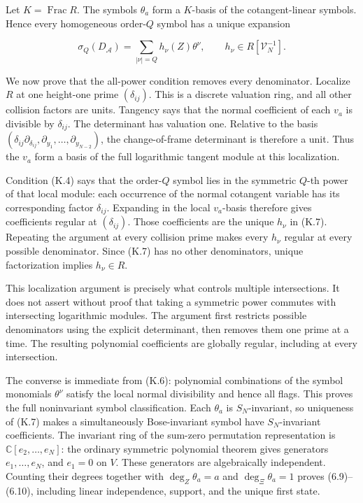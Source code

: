 Let \(K=\operatorname{Frac}R\). The symbols \(\theta_a\) form a \(K\)-basis of the cotangent-linear symbols. Hence every homogeneous order-\(Q\) symbol has a unique expansion

\[
\sigma_Q(D_{\mathcal A})=\sum_{|\nu|=Q}h_\nu(Z)\theta^\nu,
\qquad h_\nu\in R[\mathcal V_N^{-1}].
\tag{K.7}
\]

We now prove that the all-power condition removes every denominator. Localize \(R\) at one height-one prime \((\delta_{ij})\). This is a discrete valuation ring, and all other collision factors are units. Tangency says that the normal coefficient of each \(v_a\) is divisible by \(\delta_{ij}\). The determinant has valuation one. Relative to the basis \((\delta_{ij}\partial_{\delta_{ij}},\partial_{y_1},\ldots,\partial_{y_{N-2}})\), the change-of-frame determinant is therefore a unit. Thus the \(v_a\) form a basis of the full logarithmic tangent module at this localization.

Condition (K.4) says that the order-\(Q\) symbol lies in the symmetric \(Q\)-th power of that local module: each occurrence of the normal cotangent variable has its corresponding factor \(\delta_{ij}\). Expanding in the local \(v_a\)-basis therefore gives coefficients regular at \((\delta_{ij})\). Those coefficients are the unique \(h_\nu\) in (K.7). Repeating the argument at every collision prime makes every \(h_\nu\) regular at every possible denominator. Since (K.7) has no other denominators, unique factorization implies \(h_\nu\in R\).

This localization argument is precisely what controls multiple intersections. It does not assert without proof that taking a symmetric power commutes with intersecting logarithmic modules. The argument first restricts possible denominators using the explicit determinant, then removes them one prime at a time. The resulting polynomial coefficients are globally regular, including at every intersection.

The converse is immediate from (K.6): polynomial combinations of the symbol monomials \(\theta^\nu\) satisfy the local normal divisibility and hence all flags. This proves the full noninvariant symbol classification. Each \(\theta_a\) is \(S_N\)-invariant, so uniqueness of (K.7) makes a simultaneously Bose-invariant symbol have \(S_N\)-invariant coefficients. The invariant ring of the sum-zero permutation representation is \(\mathbb C[e_2,\ldots,e_N]\): the ordinary symmetric polynomial theorem gives generators \(e_1,\ldots,e_N\), and \(e_1=0\) on \(V\). These generators are algebraically independent. Counting their degrees together with \(\deg_Z\theta_a=a\) and \(\deg_\Xi\theta_a=1\) proves (6.9)--(6.10), including linear independence, support, and the unique first state.

